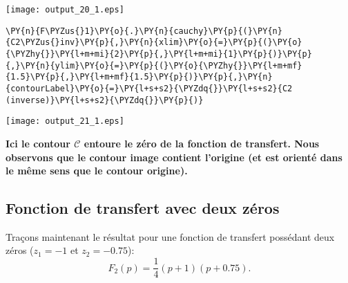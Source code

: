 \begin{center}
    \texttt{[image: output\_20\_1.eps]}
\end{center}
\begin{tcolorbox}[breakable, size=fbox, boxrule=1pt, pad at break*=1mm,colback=cellbackground, colframe=cellborder]
\begin{Verbatim}[commandchars=\\\{\}]
\PY{n}{F\PYZus{}1}\PY{o}{.}\PY{n}{cauchy}\PY{p}{(}\PY{n}{C2\PYZus{}inv}\PY{p}{,}\PY{n}{xlim}\PY{o}{=}\PY{p}{(}\PY{o}{\PYZhy{}}\PY{l+m+mi}{2}\PY{p}{,}\PY{l+m+mi}{1}\PY{p}{)}\PY{p}{,}\PY{n}{ylim}\PY{o}{=}\PY{p}{(}\PY{o}{\PYZhy{}}\PY{l+m+mf}{1.5}\PY{p}{,}\PY{l+m+mf}{1.5}\PY{p}{)}\PY{p}{,}\PY{n}{contourLabel}\PY{o}{=}\PY{l+s+s2}{\PYZdq{}}\PY{l+s+s2}{C2 (inverse)}\PY{l+s+s2}{\PYZdq{}}\PY{p}{)}
\end{Verbatim}
\end{tcolorbox}
\begin{center}
    \texttt{[image: output\_21\_1.eps]}
\end{center}
\textbf{Ici le contour \(\mathcal{C}\) entoure le zéro de la fonction de
transfert. Nous observons que le contour image contient l'origine (et
est orienté dans le même sens que le contour origine).} 
\subsection{Fonction de transfert avec deux zéros}
Traçons maintenant le résultat pour une fonction de transfert possédant
deux zéros (\(z_1=-1\) et \(z_2=-0.75\)):
\[
F_2(p)=\dfrac{1}{4}(p+1)(p+0.75).
\]
